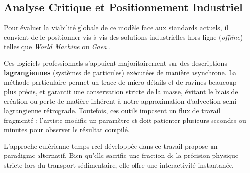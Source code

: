 \documentclass[10pt,twocolumn,a4paper]{article}
\begin{document}
\subsection{Analyse Critique et Positionnement Industriel}\label{subsec:critique}
Pour évaluer la viabilité globale de ce modèle face aux standards actuels, il convient de le positionner vis-à-vis des solutions industrielles hors-ligne (\textit{offline}) telles que \textit{World Machine} \cite{WorldMachine} ou \textit{Gaea} \cite{Gaea}.

Ces logiciels professionnels s'appuient majoritairement sur des descriptions \textbf{lagrangiennes} (systèmes de particules) exécutées de manière asynchrone. La méthode particulaire permet un tracé de micro-détails et de ravines beaucoup plus précis, et garantit une conservation stricte de la masse, évitant le biais de création ou perte de matière inhérent à notre approximation d'advection semi-lagrangienne rétrograde. Toutefois, ces outils imposent un flux de travail fragmenté : l'artiste modifie un paramètre et doit patienter plusieurs secondes ou minutes pour observer le résultat compilé.

L'approche eulérienne temps réel développée dans ce travail propose un paradigme alternatif. Bien qu'elle sacrifie une fraction de la précision physique stricte lors du transport sédimentaire, elle offre une interactivité instantanée.
\end{document}

